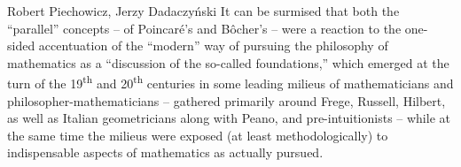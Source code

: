\begin{artengenv}{Robert Piechowicz, Jerzy Dadaczyński}
It can be surmised that both the ``parallel'' concepts -- of Poincaré's and Bôcher's -- were a reaction to the one-sided accentuation of the ``modern'' way of pursuing the philosophy of mathematics as a ``discussion of the so-called foundations,'' which emerged at the turn of the 19\textsuperscript{th} and 20\textsuperscript{th} centuries in some leading milieus of mathematicians and philosopher-mathematicians -- gathered primarily around Frege, Russell, Hilbert, as well as Italian geometricians along with Peano, and pre-intuitionists -- while at the same time the milieus were exposed (at least methodologically) to indispensable aspects of mathematics as actually pursued.

\end{artengenv}

